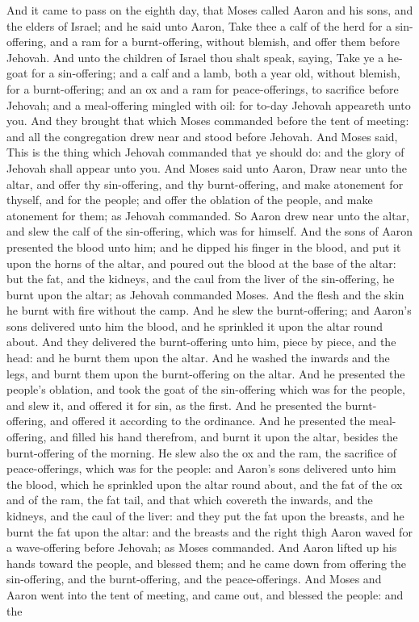 And it came to pass on the eighth day, that Moses called Aaron and his sons, and the elders of Israel; and he said unto Aaron, Take thee a calf of the herd for a sin-offering, and a ram for a burnt-offering, without blemish, and offer them before Jehovah. And unto the children of Israel thou shalt speak, saying, Take ye a he-goat for a sin-offering; and a calf and a lamb, both a year old, without blemish, for a burnt-offering; and an ox and a ram for peace-offerings, to sacrifice before Jehovah; and a meal-offering mingled with oil: for to-day Jehovah appeareth unto you. And they brought that which Moses commanded before the tent of meeting: and all the congregation drew near and stood before Jehovah. And Moses said, This is the thing which Jehovah commanded that ye should do: and the glory of Jehovah shall appear unto you. And Moses said unto Aaron, Draw near unto the altar, and offer thy sin-offering, and thy burnt-offering, and make atonement for thyself, and for the people; and offer the oblation of the people, and make atonement for them; as Jehovah commanded.  So Aaron drew near unto the altar, and slew the calf of the sin-offering, which was for himself. And the sons of Aaron presented the blood unto him; and he dipped his finger in the blood, and put it upon the horns of the altar, and poured out the blood at the base of the altar: but the fat, and the kidneys, and the caul from the liver of the sin-offering, he burnt upon the altar; as Jehovah commanded Moses. And the flesh and the skin he burnt with fire without the camp.  And he slew the burnt-offering; and Aaron’s sons delivered unto him the blood, and he sprinkled it upon the altar round about. And they delivered the burnt-offering unto him, piece by piece, and the head: and he burnt them upon the altar. And he washed the inwards and the legs, and burnt them upon the burnt-offering on the altar.  And he presented the people’s oblation, and took the goat of the sin-offering which was for the people, and slew it, and offered it for sin, as the first. And he presented the burnt-offering, and offered it according to the ordinance. And he presented the meal-offering, and filled his hand therefrom, and burnt it upon the altar, besides the burnt-offering of the morning.  He slew also the ox and the ram, the sacrifice of peace-offerings, which was for the people: and Aaron’s sons delivered unto him the blood, which he sprinkled upon the altar round about, and the fat of the ox and of the ram, the fat tail, and that which covereth the inwards, and the kidneys, and the caul of the liver: and they put the fat upon the breasts, and he burnt the fat upon the altar: and the breasts and the right thigh Aaron waved for a wave-offering before Jehovah; as Moses commanded.  And Aaron lifted up his hands toward the people, and blessed them; and he came down from offering the sin-offering, and the burnt-offering, and the peace-offerings. And Moses and Aaron went into the tent of meeting, and came out, and blessed the people: and the 